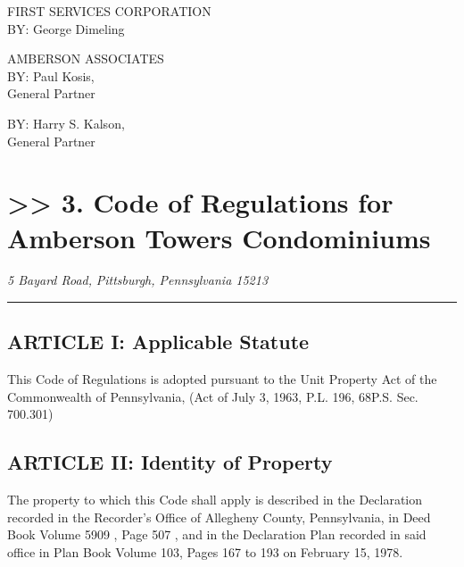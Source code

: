 \documentclass[
  14pt,
]{book}
\begin{document}
FIRST SERVICES CORPORATION\\
BY: George Dimeling

AMBERSON ASSOCIATES\\
BY: Paul Kosis,\\
General Partner

BY: Harry S. Kalson,\\
General Partner

\hypertarget{code-of-regulations-for-amberson-towers-condominiums}{%
\chapter*{\texorpdfstring{\textgreater\textgreater{} 3. Code of Regulations for Amberson Towers Condominiums}{\textgreater\textgreater{} 3. Code of Regulations for   Amberson Towers Condominiums}}\label{code-of-regulations-for-amberson-towers-condominiums}}

\emph{5 Bayard Road, }
\emph{Pittsburgh, Pennsylvania 15213}

\begin{center}\rule{0.5\linewidth}{0.5pt}\end{center}

\hypertarget{article-i-applicable-statute}{%
\section*{ARTICLE I: Applicable Statute}\label{article-i-applicable-statute}}

This Code of Regulations is adopted pursuant to the Unit Property Act of the Commonwealth of Pennsylvania, (Act of July 3, 1963, P.L. 196, 68P.S. Sec. 700.301)

\hypertarget{article-ii-identity-of-property}{%
\section*{ARTICLE II: Identity of Property}\label{article-ii-identity-of-property}}

The property to which this Code shall apply is described in the Declaration recorded in the Recorder's Office of Allegheny County, Pennsylvania, in Deed Book Volume 5909 , Page 507 , and in the Declaration Plan recorded in said office in Plan Book Volume 103, Pages 167 to 193 on February 15, 1978.
\end{document}
